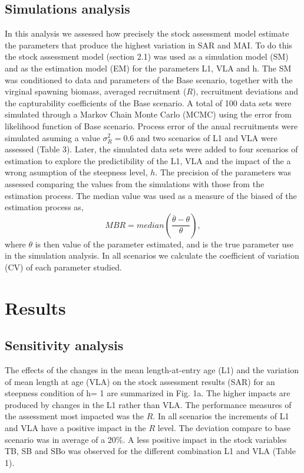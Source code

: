 \documentclass[11pt,letterpaper,]{article}
\begin{document}
\subsection{Simulations analysis}\label{simulations-analysis}

In this analysis we assessed how precisely the stock assessment model
estimate the parameters that produce the highest variation in SAR and
MAI. To do this the stock assessment model (section 2.1) was used as a
simulation model (SM) and as the estimation model (EM) for the
parameters L1, VLA and h. The SM was conditioned to data and parameters
of the Base scenario, together with the virginal spawning biomass,
averaged recruitment (\(R\)), recruitment deviations and the
capturability coefficients of the Base scenario. A total of 100 data
sets were simulated through a Markov Chain Monte Carlo (MCMC) using the
error from likelihood function of Base scenario. Process error of the
anual recruitments were simulated asuming a value \(\sigma^2_R=0.6\) and
two scenarios of L1 and VLA were assessed (Table 3). Later, the
simulated data sets were added to four scenarios of estimation to
explore the predictibility of the L1, VLA and the impact of the a wrong
asumption of the steepness level, \(h\). The precision of the parameters
was assessed comparing the values from the simulations with those from
the estimation process. The median value was used as a measure of the
biased of the estimation process as, \[ 
MBR=median\left(\frac{\overline{\theta} - \theta}{\theta}\right), 
\] where \(\theta\) is then value of the parameter estimated, and is the
true parameter use in the simulation analysis. In all scenarios we
calculate the coefficient of variation (CV) of each parameter studied.

\section{Results}\label{results}

\subsection{Sensitivity analysis}\label{sensitivity-analysis-1}

The effects of the changes in the mean length-at-entry age (L1) and the
variation of mean length at age (VLA) on the stock assessment results
(SAR) for an steepness condition of h= 1 are summarized in Fig. 1a. The
higher impacts are produced by changes in the L1 rather than VLA. The
performance measures of the assessment most impacted was the \(R\). In
all scenarios the increments of L1 and VLA have a positive impact in the
\(R\) level. The deviation compare to base scenario was in average of a
20\%. A less positive impact in the stock variables TB, SB and SBo was
observed for the different combination L1 and VLA (Table 1).
\end{document}
